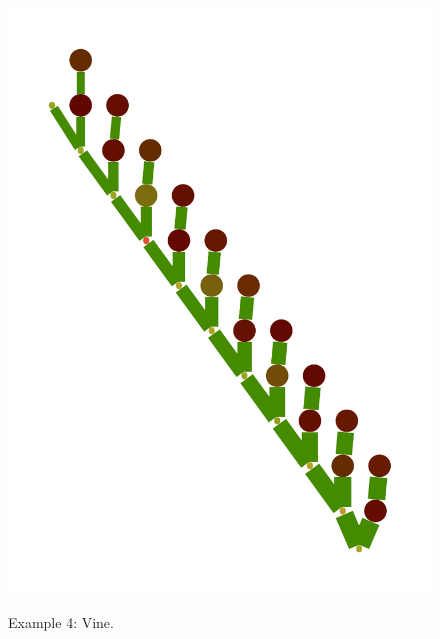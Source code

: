 \documentclass[a4paper,10pt]{article}
\begin{document}
\begin{figure}
{    \includegraphics[scale=.14]{../figures/vector/6-4-vine-induced-9.pdf}
    \label{fig:exp-vine-induced}    
    }
  \caption{Example 4: Vine.}
  \label{fig:exp-vine}
\end{figure}
\end{document}
